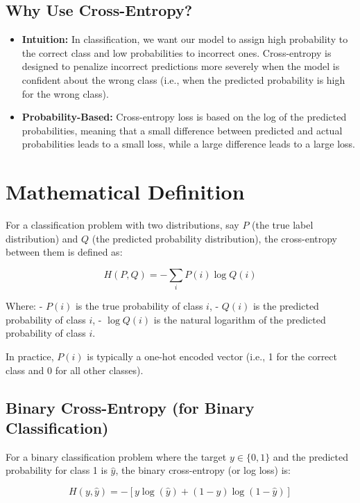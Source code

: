 \documentclass[12pt]{book}
\begin{document}
\subsection{Why Use Cross-Entropy?}
    \begin{itemize}
        \item [-] \textbf{Intuition:} In classification, we want our model to assign high probability to the correct class and low probabilities to incorrect ones. Cross-entropy is designed to penalize incorrect predictions more severely when the model is confident about the wrong class (i.e., when the predicted probability is high for the wrong class).
        \item [-] \textbf{Probability-Based:} Cross-entropy loss is based on the log of the predicted probabilities, meaning that a small difference between predicted and actual probabilities leads to a small loss, while a large difference leads to a large loss.
    \end{itemize}

\section{Mathematical Definition}

For a classification problem with two distributions, say \( P \) (the true label distribution) and \( Q \) (the predicted probability distribution), the cross-entropy between them is defined as:

\[
H(P, Q) = - \sum_{i} P(i) \log Q(i)
\]

Where:
- \( P(i) \) is the true probability of class \( i \),
- \( Q(i) \) is the predicted probability of class \( i \),
- \( \log Q(i) \) is the natural logarithm of the predicted probability of class \( i \).

In practice, \( P(i) \) is typically a one-hot encoded vector (i.e., 1 for the correct class and 0 for all other classes).

\subsection*{Binary Cross-Entropy (for Binary Classification)}

For a binary classification problem where the target \( y \in \{0, 1\} \) and the predicted probability for class 1 is \( \hat{y} \), the binary cross-entropy (or log loss) is:

\[
H(y, \hat{y}) = -[y \log(\hat{y}) + (1 - y) \log(1 - \hat{y})]
\]
\end{document}
